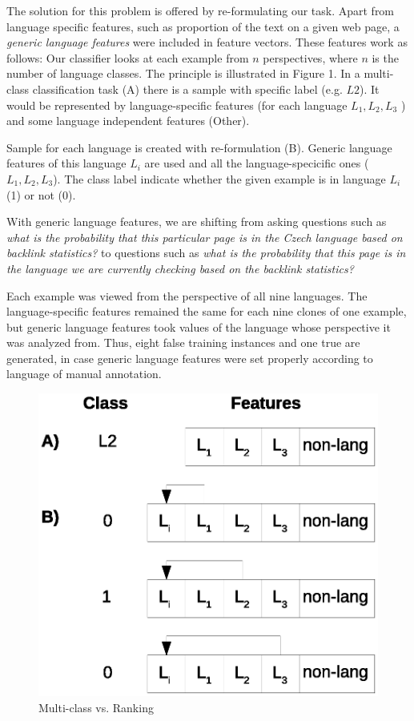 \documentclass{acm_proc_article-sp}
\begin{document}
  The solution for this problem is offered by re-formulating our task.
  Apart from language specific features, such as proportion of the text on a given 
  web page, a \textit{generic language features} were included in feature vectors. These features work as follows:
  Our classifier looks at each example from $n$ perspectives, where $n$ is the number of language classes.
  The principle is illustrated in Figure 1. 
  In a multi-class classification task (A) there is a sample with specific label (e.g. $L2$).
  It would be represented by language-specific features (for each language $L_1,L_2,L_3$ ) and some 
  language independent features (Other).


  Sample for each language is created with re-formulation (B).
  Generic language features of this language $L_i$ are used and all the language-specicific
  ones ($L_1, L_2, L_3$). The class label indicate whether the given example is in language $L_i$ (1) or not (0).


  With generic language features, we are shifting from asking questions such as \textit{what is the probability that 
    this particular page is in the Czech language based on backlink statistics?} to questions 
    such as \textit{what is the probability that this page is in the language we are currently checking 
    based on the backlink statistics?} 
 
 Each example was viewed from the perspective of all nine languages. The 
  language-specific features remained the same for each nine clones of one example,
  but generic language features took values of the language whose perspective
  it was analyzed from.  Thus, eight false training instances and 
  one true are generated, in case generic language features were set properly according to 
  language of manual annotation.

  \begin{figure}
      \caption{Multi-class vs. Ranking} 
     \label{examples} 
 
 \vspace{0.2cm}
      \centering
      \includegraphics[scale=0.5]{multi-class.eps}
 \end{figure}
\end{document}
